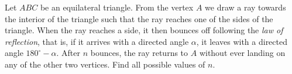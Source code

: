 Let $ABC$ be an equilateral triangle. From the vertex $A$ we draw a ray towards the interior of the triangle such that the ray reaches one of the sides of the triangle. When the ray reaches a side, it then bounces off following the \emph{law of reflection}, that is, if it arrives with a directed angle $\alpha$, it leaves with a directed angle $180^{\circ}-\alpha$. After $n$ bounces, the ray returns to $A$ without ever landing on any of the other two vertices. Find all possible values of $n$.